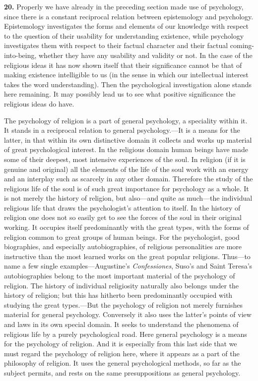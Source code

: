 \documentclass[12pt,a4paper]{book}
\newcommand{\opage}[1]{\marginnote{\footnotesize\textit{[#1]}}}
\begin{document}
\noindent
\opage{53}\textbf{20.} Properly we have already in the preceding section made
use of psychology, since there is a constant reciprocal relation between
epistemology and psychology. Epistemology investigates the forms and elements
of our knowledge with respect to the question of their usability for
understanding existence, while psychology investigates them with respect to
their factual character and their factual coming-into-being, whether they have
any usability and validity or not. In the case of the religious ideas it has
now shown itself that their significance cannot be that of making existence
intelligible to us (in the sense in which our intellectual interest takes the
word understanding). Then the psychological investigation alone stands here
remaining. It may possibly lead us to see what positive significance the
religious ideas do have.

The psychology of religion is a part of general psychology, a speciality
within it. It stands in a reciprocal relation to general psychology.---It is a
means for the latter, in that within its own distinctive domain it collects
and works up material of great psychological interest. In the religious domain
human beings have made some of their deepest, most intensive experiences of
the soul. In religion (if it is genuine and original) all the elements of the
life of the soul work with an energy and an interplay such as scarcely in any
other domain. Therefore the study of the religious life of the soul is of such
great importance for psychology as a whole. It is not merely the history of
religion, but also---and quite as much---the individual religious life that
draws the psychologist's attention to itself. In the history of religion one
does not so easily get to see the forces of the soul in their original working.
It occupies itself predominantly with the great types, with the forms of
religion common to great groups of human beings. For the psychologist, good
biographies, and especially autobiographies, of religious personalities are
more instructive than the most learned works on the great popular religions.
Thus---to name a few single examples---Augustine's \emph{Confessiones}, Suso's
and Saint Teresa's 
\opage{54}autobiographies belong to the most important material of the
psychology of religion. The history of individual religiosity naturally also
belongs under the history of religion; but this has hitherto been
predominantly occupied with studying the great types.---But the psychology of
religion not merely furnishes material for general psychology. Conversely it
also uses the latter's points of view and laws in its own special domain. It
seeks to understand the phenomena of religious life by a purely psychological
road. Here general psychology is a means for the psychology of religion. And it
is especially from this last side that we must regard the psychology of
religion here, where it appears as a part of the philosophy of religion. It
uses the general psychological methods, so far as the subject permits, and
rests on the same presuppositions as general psychology.
\end{document}
